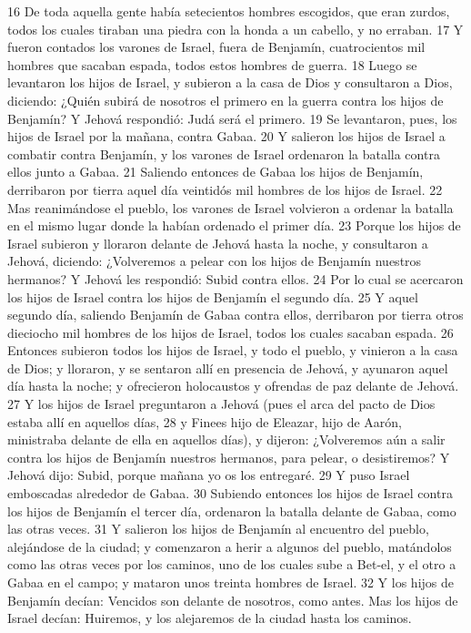 16 De toda aquella gente había setecientos hombres escogidos, que eran zurdos, todos los cuales tiraban una piedra con la honda a un cabello, y no erraban.
17 Y fueron contados los varones de Israel, fuera de Benjamín, cuatrocientos mil hombres que sacaban espada, todos estos hombres de guerra.
18 Luego se levantaron los hijos de Israel, y subieron a la casa de Dios y consultaron a Dios, diciendo: ¿Quién subirá de nosotros el primero en la guerra contra los hijos de Benjamín? Y Jehová respondió: Judá será el primero.
19 Se levantaron, pues, los hijos de Israel por la mañana, contra Gabaa.
20 Y salieron los hijos de Israel a combatir contra Benjamín, y los varones de Israel ordenaron la batalla contra ellos junto a Gabaa.
21 Saliendo entonces de Gabaa los hijos de Benjamín, derribaron por tierra aquel día veintidós mil hombres de los hijos de Israel.
22 Mas reanimándose el pueblo, los varones de Israel volvieron a ordenar la batalla en el mismo lugar donde la habían ordenado el primer día.
23 Porque los hijos de Israel subieron y lloraron delante de Jehová hasta la noche, y consultaron a Jehová, diciendo: ¿Volveremos a pelear con los hijos de Benjamín nuestros hermanos? Y Jehová les respondió: Subid contra ellos.
24 Por lo cual se acercaron los hijos de Israel contra los hijos de Benjamín el segundo día.
25 Y aquel segundo día, saliendo Benjamín de Gabaa contra ellos, derribaron por tierra otros dieciocho mil hombres de los hijos de Israel, todos los cuales sacaban espada.
26 Entonces subieron todos los hijos de Israel, y todo el pueblo, y vinieron a la casa de Dios; y lloraron, y se sentaron allí en presencia de Jehová, y ayunaron aquel día hasta la noche; y ofrecieron holocaustos y ofrendas de paz delante de Jehová.
27 Y los hijos de Israel preguntaron a Jehová (pues el arca del pacto de Dios estaba allí en aquellos días,
28 y Finees hijo de Eleazar, hijo de Aarón, ministraba delante de ella en aquellos días), y dijeron: ¿Volveremos aún a salir contra los hijos de Benjamín nuestros hermanos, para pelear, o desistiremos? Y Jehová dijo: Subid, porque mañana yo os los entregaré.
29 Y puso Israel emboscadas alrededor de Gabaa.
30 Subiendo entonces los hijos de Israel contra los hijos de Benjamín el tercer día, ordenaron la batalla delante de Gabaa, como las otras veces.
31 Y salieron los hijos de Benjamín al encuentro del pueblo, alejándose de la ciudad; y comenzaron a herir a algunos del pueblo, matándolos como las otras veces por los caminos, uno de los cuales sube a Bet-el, y el otro a Gabaa en el campo; y mataron unos treinta hombres de Israel.
32 Y los hijos de Benjamín decían: Vencidos son delante de nosotros, como antes. Mas los hijos de Israel decían: Huiremos, y los alejaremos de la ciudad hasta los caminos.

